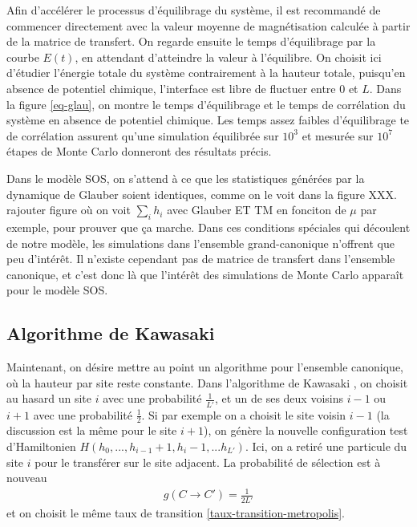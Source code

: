 Afin d'accélérer le processus d'équilibrage du système, il est recommandé de commencer directement avec la valeur moyenne de magnétisation calculée à partir de la matrice de transfert. On regarde ensuite le temps d'équilibrage par la courbe $E(t)$, en attendant d'atteindre la valeur à l'équilibre. On choisit ici d'étudier l'énergie totale du système contrairement à la hauteur totale, puisqu'en absence de potentiel chimique, l'interface est libre de fluctuer entre $0$ et $L$. Dans la figure \ref{eq-glau}, on montre le temps d'équilibrage et le temps de corrélation du système en absence de potentiel chimique. Les temps assez faibles d'équilibrage te de corrélation assurent qu'une simulation équilibrée sur $10^3$ et mesurée sur $10^7$ étapes de Monte Carlo donneront des résultats précis.

Dans le modèle SOS, on s'attend à ce que les statistiques générées par la dynamique de Glauber soient identiques, comme on le voit dans la figure XXX.
{\color{red} rajouter figure où on voit $\sum_i h_i$ avec Glauber ET TM en fonciton de $\mu$ par exemple, pour prouver que ça marche.}
Dans ces conditions spéciales qui découlent de notre modèle, les simulations dans l'ensemble grand-canonique n'offrent que peu d'intérêt. Il n'existe cependant pas de matrice de transfert dans l'ensemble canonique, et c'est donc là que l'intérêt des simulations de Monte Carlo apparaît pour le modèle SOS.

    \subsection{Algorithme de Kawasaki}

Maintenant, on désire mettre au point un algorithme pour l'ensemble canonique, où la hauteur par site reste constante. Dans l'algorithme de Kawasaki \cite{kawasaki_diffusion_1966}, on choisit au hasard un site $i$ avec une probabilité $\frac{1}{L'}$, et un de ses deux voisins $i-1$ ou $i+1$ avec une probabilité $\frac{1}{2}$. Si par exemple on a choisit le site voisin $i-1$ (la discussion est la même pour le site $i+1$), on génère  la nouvelle configuration test d'Hamiltonien $H(h_0,...,h_{i-1}+1,h_i-1,...h_{L'})$. Ici, on a retiré une particule du site $i$ pour le transférer sur le site adjacent. 
La probabilité de sélection est à nouveau
\begin{align}
    g(C\to C') = \frac{1}{2L'}
\end{align}
et on choisit le même taux de transition  \ref{taux-transition-metropolis}.

